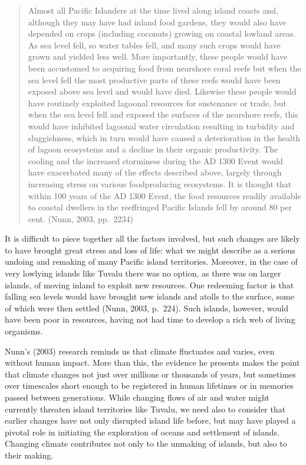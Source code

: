 \documentclass[letterpaper,10pt,english]{sphinxmanual}
\begin{document}
\begin{quote}

Almost all Pacific Islanders at the time lived along island coasts and, although they may have had inland food gardens, they would also have depended on crops (including coconuts) growing on coastal lowland areas. As sea level fell, so water tables fell, and many such crops would have grown and yielded less well. More importantly, these people would have been accustomed to acquiring food from nearshore coral reefs but when the sea level fell the most productive parts of these reefs would have
been exposed above sea level and would have died. Likewise these people would have routinely exploited lagoonal resources for sustenance or trade, but when the sea level fell and exposed the surfaces of the nearshore reefs, this would have inhibited lagoonal water circulation resulting in turbidity and sluggishness, which in turn would have caused a deterioration in the health of lagoon ecosystems and a decline in their organic productivity. The cooling and the increased storminess during the
AD 1300 Event would have exacerbated many of the effects described above, largely through increasing stress on various food\sphinxhyphen{}producing ecosystems. It is thought that within 100 years of the AD 1300 Event, the food resources readily available to coastal dwellers in the reef\sphinxhyphen{}fringed Pacific Islands fell by around 80 per cent. (Nunn, 2003, pp. 223\textendash{}4)
\end{quote}

It is difficult to piece together all the factors involved, but such changes are likely to have brought great stress and loss of life: what we might describe as a serious undoing and remaking of many Pacific island territories. Moreover, in the case of very low\sphinxhyphen{}lying islands like Tuvalu there was no option, as there was on larger islands, of moving inland to exploit new resources. One redeeming factor is that falling sea levels would have brought new islands and atolls to the surface, some of
which were then settled (Nunn, 2003, p. 224). Such islands, however, would have been poor in resources, having not had time to develop a rich web of living organisms.

Nunn’s (2003) research reminds us that climate fluctuates and varies, even without human impact. More than this, the evidence he presents makes the point that climate changes not just over millions or thousands of years, but sometimes over timescales short enough to be registered in human lifetimes or in memories passed between generations. While changing flows of air and water might currently threaten island territories like Tuvalu, we need also to consider that earlier changes have not only
disrupted island life before, but may have played a pivotal role in initiating the exploration of oceans and settlement of islands. Changing climate contributes not only to the unmaking of islands, but also to their making.
\end{document}
